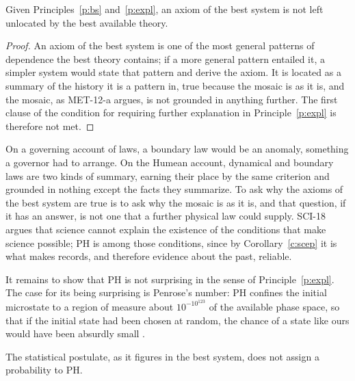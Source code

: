 \documentclass{situationist-preprint}
\begin{document}
\begin{lemma}\label{l:closure}
Given Principles~\ref{p:bs} and~\ref{p:expl}, an axiom of the best system is not left unlocated by the best available theory.
\end{lemma}

\begin{proof}
An axiom of the best system is one of the most general patterns of dependence the best theory contains; if a more general pattern entailed it, a simpler system would state that pattern and derive the axiom. It is located as a summary of the history it is a pattern in, true because the mosaic is as it is, and the mosaic, as MET-12-a argues, is not grounded in anything further. The first clause of the condition for requiring further explanation in Principle~\ref{p:expl} is therefore not met.
\end{proof}

On a governing account of laws, a boundary law would be an anomaly, something a governor had to arrange. On the Humean account, dynamical and boundary laws are two kinds of summary, earning their place by the same criterion and grounded in nothing except the facts they summarize. To ask why the axioms of the best system are true is to ask why the mosaic is as it is, and that question, if it has an answer, is not one that a further physical law could supply. SCI-18 argues that science cannot explain the existence of the conditions that make science possible; PH is among those conditions, since by Corollary~\ref{c:scep} it is what makes records, and therefore evidence about the past, reliable.

It remains to show that PH is not surprising in the sense of Principle~\ref{p:expl}. The case for its being surprising is Penrose's number: PH confines the initial microstate to a region of measure about $10^{-10^{123}}$ of the available phase space, so that if the initial state had been chosen at random, the chance of a state like ours would have been absurdly small \citep{Penrose1989}.

\begin{lemma}\label{l:measure}
The statistical postulate, as it figures in the best system, does not assign a probability to PH.
\end{lemma}
\end{document}
